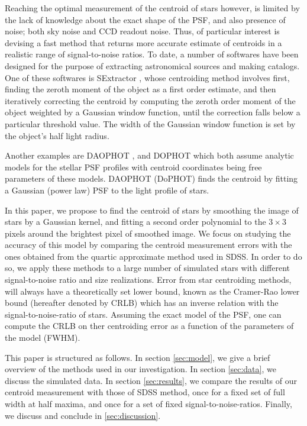 \documentclass[12pt, preprint]{aastex}
\begin{document}
Reaching the optimal measurement of the centroid of stars however, is limited
by the lack of knowledge about the exact shape of the PSF, and also presence of noise;
both sky noise and CCD readout noise. Thus, of particular interest is devising a fast method that returns
more accurate estimate of centroids in a realistic range of signal-to-noise ratios.       
To date, a number of softwares have been designed for the purpose of extracting astronomical
sources and making catalogs. One of these softwares is SExtractor \citep{sex},
whose centroiding method involves first, finding the zeroth moment of the object
as a first order estimate, and then iteratively correcting the centroid by computing
the zeroth order moment of the object weighted by a Gaussian window function,
until the correction falls below a particular threshold value.
The width of the Gaussian window function is set by the object's half light radius.

Another examples are DAOPHOT \citep{daophot}, and DOPHOT \citep{dophot}
which both assume analytic models for the stellar PSF profiles with centroid
coordinates being free parameters of these models.
DAOPHOT (DoPHOT) finds the centroid by fitting a Gaussian (power law) PSF to
the light profile of stars.

In this paper, we propose to find the centroid of stars by smoothing the image
of stars by a Gaussian kernel, and fitting a second order polynomial to
the $3\times3$ pixels around the brightest pixel of smoothed image.
We focus on studying the accuracy of this model by comparing the centroid
measurement errors with the ones obtained from the quartic approximate method used in SDSS.
In order to do so, we apply these methods to a large number of simulated
stars with different signal-to-noise ratio and size realizations. 
Error from star centroiding methods, will always have 
a theoretically set lower bound, known as the Cramer-Rao lower bound
(hereafter denoted by CRLB) which has an inverse relation with the
signal-to-noise-ratio of stars. Assuming the exact model of the PSF,
one can compute the CRLB on ther centroiding error as a function of the
parameters of the model (\eg FWHM).


This paper is structured as follows. In section \ref{sec:model}, we give a brief overview of the methods used in our investigation. In section \ref{sec:data}, we discuss the simulated data. In section \ref{sec:results}, we compare the results of our centroid measurement with those of SDSS method, once for a fixed set of full width at half maxima, and once for a set of fixed signal-to-noise-ratios. Finally, we discuss and conclude in \ref{sec:discussion}.               
\end{document}
